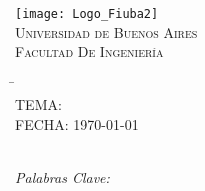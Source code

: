 \begin{titlepage}
	
		\thispagestyle{empty}

		\begin{center}
			\texttt{[image: Logo\_Fiuba2]}\\
			\large{\textsc{Universidad de Buenos Aires}}\\
			\large{\textsc{Facultad De Ingeniería}}\\
			\small{\myTimePeriod}
		\end{center}

		\vfill

		\begin{center}
			\Large{\underline{\textsc{\mySubject}}}
		\end{center}

		\vfill

		\begin{tabbing}
			\hspace{2cm}\=\+\myTitle\\
				TEMA: \mySubtitle\\
				FECHA: \today\\
			\\
				\MembersHeader
				\MembersOnCover	
		\end{tabbing}

%			

	\ifKeywords
		\begin{center}
			\emph{Palabras Clave: \myKeywords}
		\end{center}
	\fi	

		\vfill
	
\end{titlepage}

\ifPagebreak
	\thispagestyle{empty}
	\ifIndex
		\tableofcontents
	\fi

	\pagebreak
\fi

